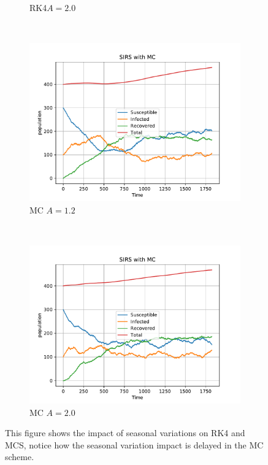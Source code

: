 \begin{figure}[H]
\begin{subfigure}{0.49\textwidth}
         \caption{RK4$A=2.0$}
    \end{subfigure}
     ~ 
    \begin{subfigure}{0.49\textwidth}
         \centering
         \includegraphics[width=\linewidth]{../fig/newfig/MCSV_A=12T=5.pdf}
         \caption{MC $A=1.2$ }
    \end{subfigure}
     ~ 
    \begin{subfigure}{0.49\textwidth}
         \centering
         \includegraphics[width=\linewidth]{../fig/newfig/MCSV_A=20T=5.pdf}
         \caption{MC $A = 2.0$ }
    \end{subfigure}
    \caption{This figure shows the impact of seasonal variations on RK4 and MCS, notice how the seasonal variation impact is delayed in the MC scheme.}
    \label{fig:RK4VD3}
\end{figure}




